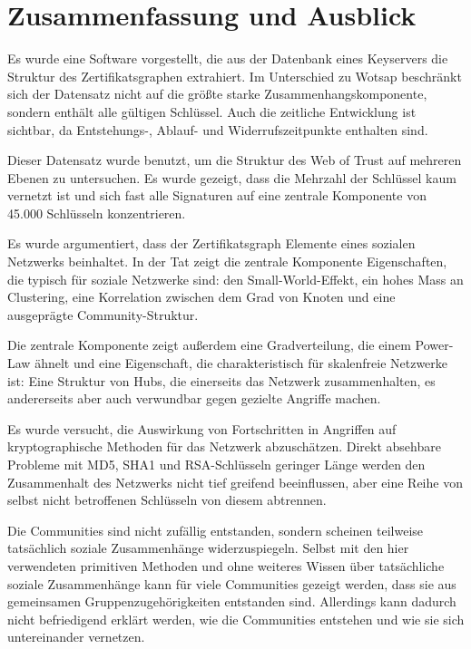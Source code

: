 
\chapter{Zusammenfassung und Ausblick}
\label{ch:Zusammenfassung}

Es wurde eine Software vorgestellt, die aus der Datenbank eines
Keyservers die Struktur des Zertifikatsgraphen extrahiert. Im
Unterschied zu Wotsap beschränkt sich der Datensatz nicht auf die
größte starke Zusammenhangskomponente, sondern enthält alle
g\"ultigen Schlüssel. Auch die zeitliche Entwicklung ist sichtbar, da
Entstehungs-, Ablauf- und Widerrufszeitpunkte enthalten sind.

Dieser Datensatz wurde benutzt, um die Struktur des Web of Trust auf
mehreren Ebenen zu untersuchen. Es wurde gezeigt, dass die Mehrzahl
der Schlüssel kaum vernetzt ist und sich fast alle Signaturen auf
eine zentrale Komponente von 45.000 Schlüsseln konzentrieren. 

Es wurde argumentiert, dass der Zertifikatsgraph Elemente eines
sozialen Netzwerks beinhaltet. In der Tat zeigt die zentrale
Komponente Eigenschaften, die typisch für soziale Netzwerke sind:
den Small-World-Effekt, ein hohes Mass an Clustering, eine Korrelation
zwischen dem Grad von Knoten und eine ausgeprägte
Community-Struktur.

Die zentrale Komponente zeigt außerdem eine Gradverteilung, die einem
Power-Law ähnelt und eine Eigenschaft, die charakteristisch für
skalenfreie Netzwerke ist: Eine Struktur von Hubs, die einerseits das
Netzwerk zusammenhalten, es andererseits aber auch verwundbar gegen
gezielte Angriffe machen. 

Es wurde versucht, die Auswirkung von Fortschritten in Angriffen auf
kryptographische Methoden für das Netzwerk abzuschätzen. Direkt
absehbare Probleme mit MD5, SHA1 und RSA-Schlüsseln geringer Länge
werden den Zusammenhalt des Netzwerks nicht tief greifend beeinflussen,
aber eine Reihe von selbst nicht betroffenen Schlüsseln von diesem
abtrennen.

Die Communities sind nicht zufällig entstanden, sondern scheinen
teilweise tatsächlich soziale Zusammenhänge
widerzuspiegeln. Selbst mit den hier verwendeten primitiven Methoden
und ohne weiteres Wissen über tatsächliche soziale Zusammenhänge
kann für viele Communities gezeigt werden, dass sie aus gemeinsamen
Gruppenzugehörigkeiten entstanden sind. Allerdings kann dadurch
nicht befriedigend erklärt werden, wie die Communities entstehen
und wie sie sich untereinander vernetzen.

